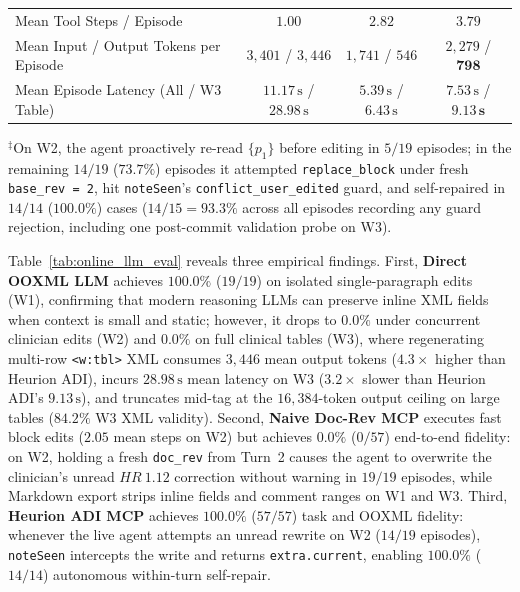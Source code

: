 \documentclass[11pt,a4paper]{article}
\begin{document}
\begin{table}[!t]
{\begin{tabular}{@{}lccc@{}}
\midrule
Mean Tool Steps / Episode & $1.00$ & $2.82$ & $3.79$ \\
Mean Input / Output Tokens per Episode & $3{,}401$ / $3{,}446$ & $1{,}741$ / $546$ & $2{,}279$ / $\mathbf{798}$ \\
Mean Episode Latency (All / W3 Table) & $11.17\,\text{s}$ / $28.98\,\text{s}$ & $5.39\,\text{s}$ / $6.43\,\text{s}$ & $7.53\,\text{s}$ / $\mathbf{9.13\,\text{s}}$ \\
\bottomrule
\end{tabular}%
}
\vspace{2pt}
\raggedright\footnotesize $^\ddagger$On W2, the agent proactively re-read $\{p_1\}$ before editing in $5/19$ episodes; in the remaining $14/19$ ($73.7\%$) episodes it attempted \texttt{replace\_block} under fresh \texttt{base\_rev = 2}, hit \texttt{noteSeen}'s \texttt{conflict\_user\_edited} guard, and self-repaired in $14/14$ ($100.0\%$) cases ($14/15 = 93.3\%$ across all episodes recording any guard rejection, including one post-commit validation probe on W3).
\end{table}

Table~\ref{tab:online_llm_eval} reveals three empirical findings. First, \textbf{Direct OOXML LLM} achieves $100.0\%$ ($19/19$) on isolated single-paragraph edits (W1), confirming that modern reasoning LLMs can preserve inline XML fields when context is small and static; however, it drops to $0.0\%$ under concurrent clinician edits (W2) and $0.0\%$ on full clinical tables (W3), where regenerating multi-row \texttt{<w:tbl>} XML consumes $3{,}446$ mean output tokens ($4.3\times$ higher than Heurion ADI), incurs $28.98\,\text{s}$ mean latency on W3 ($3.2\times$ slower than Heurion ADI's $9.13\,\text{s}$), and truncates mid-tag at the $16{,}384$-token output ceiling on large tables ($84.2\%$ W3 XML validity). Second, \textbf{Naive Doc-Rev MCP} executes fast block edits ($2.05$ mean steps on W2) but achieves $0.0\%$ ($0/57$) end-to-end fidelity: on W2, holding a fresh \texttt{doc\_rev} from Turn~2 causes the agent to overwrite the clinician's unread $HR~1.12$ correction without warning in $19/19$ episodes, while Markdown export strips inline fields and comment ranges on W1 and W3. Third, \textbf{Heurion ADI MCP} achieves $100.0\%$ ($57/57$) task and OOXML fidelity: whenever the live agent attempts an unread rewrite on W2 ($14/19$ episodes), \texttt{noteSeen} intercepts the write and returns \texttt{extra.current}, enabling $100.0\%$ ($14/14$) autonomous within-turn self-repair.

\end{document}
